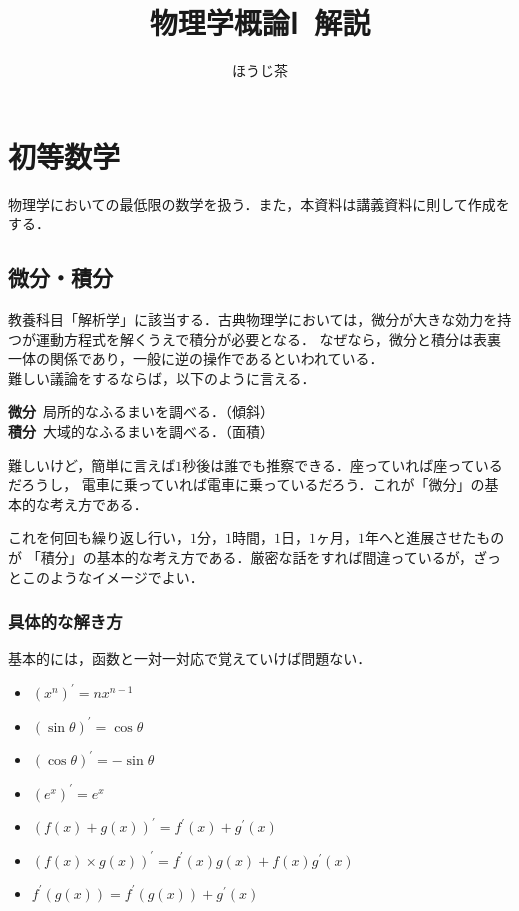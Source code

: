 \documentclass[a4paper,11pt]{ltjsarticle}
\title{物理学概論Ⅰ\ 解説}
\author{ほうじ茶}
\date{}
\begin{document}
\pagestyle{fancy}
\rhead{}
\cfoot{\thepage}

\maketitle
\tableofcontents
\clearpage

\section{初等数学}

物理学においての最低限の数学を扱う．また，本資料は講義資料に則して作成をする．

\subsection{微分・積分}

教養科目「解析学」に該当する．古典物理学においては，微分が大きな効力を持つが運動方程式を解くうえで積分が必要となる．
なぜなら，微分と積分は表裏一体の関係であり，一般に逆の操作であるといわれている．\\

難しい議論をするならば，以下のように言える．

\begin{screen}
  \begin{center}
    \textbf{微分}\  局所的なふるまいを調べる．（傾斜）\\
    \textbf{積分}\  大域的なふるまいを調べる．（面積）
  \end{center}
\end{screen}


難しいけど，簡単に言えば$1$秒後は誰でも推察できる．座っていれば座っているだろうし，
電車に乗っていれば電車に乗っているだろう．これが「微分」の基本的な考え方である．

これを何回も繰り返し行い，$1$分，$1$時間，$1$日，$1$ヶ月，$1$年へと進展させたものが
「積分」の基本的な考え方である．厳密な話をすれば間違っているが，ざっとこのようなイメージでよい．

\subsubsection{具体的な解き方}


基本的には，函数と一対一対応で覚えていけば問題ない．

\begin{itemize}
  \item $(x^{n})^{\prime}=nx^{n-1}$
  \item $(\sin{\theta})^{\prime}=\cos{\theta}$
  \item $(\cos{\theta})^{\prime}=-\sin{\theta}$
  \item $(e^{x})^{\prime}=e^{x}$
  \item $(f(x)+g(x))^{\prime}=f^{\prime}(x)+g^{\prime}(x)$
  \item $(f(x)\times g(x))^{\prime}=f^{\prime}(x)g(x)+f(x)g^{\prime}(x)$
  \item $f^{\prime}(g(x))=f^{\prime}(g(x))+g^{\prime}(x)$
\end{itemize}
\end{document}

